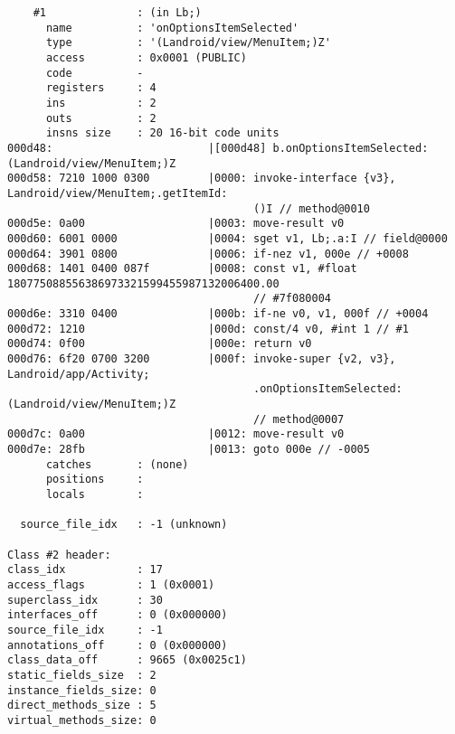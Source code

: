 \begin{lstlisting}
    #1              : (in Lb;)
      name          : 'onOptionsItemSelected'
      type          : '(Landroid/view/MenuItem;)Z'
      access        : 0x0001 (PUBLIC)
      code          -
      registers     : 4
      ins           : 2
      outs          : 2
      insns size    : 20 16-bit code units
000d48:                        |[000d48] b.onOptionsItemSelected:(Landroid/view/MenuItem;)Z
000d58: 7210 1000 0300         |0000: invoke-interface {v3}, Landroid/view/MenuItem;.getItemId:
                                      ()I // method@0010
000d5e: 0a00                   |0003: move-result v0
000d60: 6001 0000              |0004: sget v1, Lb;.a:I // field@0000
000d64: 3901 0800              |0006: if-nez v1, 000e // +0008
000d68: 1401 0400 087f         |0008: const v1, #float 180775088556386973321599455987132006400.00
                                      // #7f080004
000d6e: 3310 0400              |000b: if-ne v0, v1, 000f // +0004
000d72: 1210                   |000d: const/4 v0, #int 1 // #1
000d74: 0f00                   |000e: return v0
000d76: 6f20 0700 3200         |000f: invoke-super {v2, v3}, Landroid/app/Activity;
                                      .onOptionsItemSelected:(Landroid/view/MenuItem;)Z
                                      // method@0007
000d7c: 0a00                   |0012: move-result v0
000d7e: 28fb                   |0013: goto 000e // -0005
      catches       : (none)
      positions     :
      locals        :

  source_file_idx   : -1 (unknown)

Class #2 header:
class_idx           : 17
access_flags        : 1 (0x0001)
superclass_idx      : 30
interfaces_off      : 0 (0x000000)
source_file_idx     : -1
annotations_off     : 0 (0x000000)
class_data_off      : 9665 (0x0025c1)
static_fields_size  : 2
instance_fields_size: 0
direct_methods_size : 5
virtual_methods_size: 0


\end{lstlisting}
